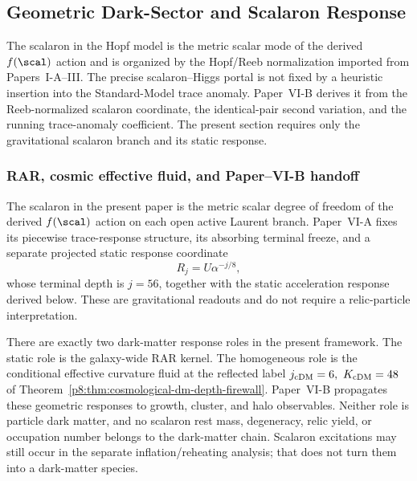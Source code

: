 \documentclass[12pt,a4paper]{article}
\begin{document}
\subsection{Geometric Dark-Sector and Scalaron Response}

The scalaron in the Hopf model is the metric scalar mode of the derived \(f(\scal)\) action and is organized by the Hopf/Reeb normalization imported from Papers~I-A--III.  The precise scalaron--Higgs portal is not fixed by a heuristic insertion into the Standard-Model trace anomaly.  Paper~VI-B derives it from the Reeb-normalized scalaron coordinate, the identical-pair second variation, and the running trace-anomaly coefficient.  The present section requires only the gravitational scalaron branch and its static response.

\subsubsection{RAR, cosmic effective fluid, and Paper--VI-B handoff}
\label{p8:sec:dm-status}
The scalaron in the present paper is the metric scalar degree of freedom of
the derived \(f(\scal)\) action on each open active Laurent branch.
Paper~VI-A fixes its piecewise trace-response structure, its absorbing
terminal freeze, and a separate projected static response coordinate
\[
R_j=U\alpha^{-j/8},
\]
whose terminal depth is $j=56$, together with the static acceleration response derived below.  These are gravitational readouts and do not require a relic-particle interpretation.

There are exactly two dark-matter response roles in the present framework.
The static role is the galaxy-wide RAR kernel.  The homogeneous role is the
conditional effective curvature fluid at the reflected label
\(j_{\rm cDM}=6,\ K_{\rm cDM}=48\) of
Theorem~\ref{p8:thm:cosmological-dm-depth-firewall}.  Paper~VI-B propagates
these geometric responses to growth, cluster, and halo observables.  Neither
role is particle dark matter, and no scalaron rest mass, degeneracy, relic
yield, or occupation number belongs to the dark-matter chain.  Scalaron
excitations may still occur in the separate inflation/reheating analysis;
that does not turn them into a dark-matter species.
\end{document}
